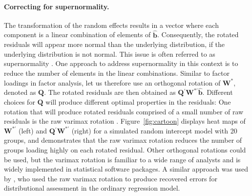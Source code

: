 \documentclass[12pt]{article} %
\newcommand{\hh}[1]{{\color{orange} #1}}
\newcommand{\al}[1]{{\color{red} #1}}
\newcommand{\trans}{\ensuremath{^\prime}}
\begin{document}
{\paragraph{Correcting for supernormality.}
The transformation of the random effects results in a vector where each component is a linear combination of elements of $\widehat{\bm{b}}$. Consequently, the rotated residuals will appear more normal than the underlying distribution, if the underlying distribution is not normal. This issue is often referred to as supernormality \citep{Atkinson:1985}. One approach to address supernormality in this context is to reduce the number of elements in the linear combinations.
\hh{Similar to factor loadings in factor analysis, let us therefore use an orthogonal rotation of $\bm{W}^*$, denoted as $\bm{Q}$. }
The rotated residuals are then obtained as $\bm{Q}\trans \bm{W}^{*\prime} \widehat{\bm{b}}$. 
\hh{Different choices for  $\bm{Q}$ will produce different optimal properties in the residuals: }
One rotation that will produce rotated residuals comprised of a small number of raw residuals is the raw varimax rotation \citep{Johnson:2007}. Figure~\ref{fig:cartoon} displays heat maps of $\bm{W}^{*\prime}$ (left) and $\bm{Q}\trans\bm{W}^{*\prime}$ (right) for a simulated random intercept model with 20 groups, and demonstrates that the raw varimax rotation reduces the number of groups loading highly on each rotated residual. %
Other orthogonal rotations could be used, but the varimax rotation is familiar to a wide range of analysts and is widely implemented in statistical software packages. A similar approach was used by \cite{Jensen:1999iu}, who used the raw varimax rotation to produce recovered errors for distributional assessment in the ordinary regression model.

}
\end{document}
